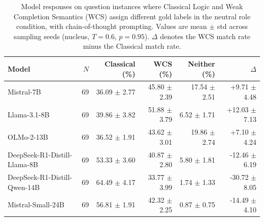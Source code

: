 \begin{table}[htbp]
\caption{Model responses on question instances where Classical Logic and Weak Completion Semantics (WCS) assign different gold labels in the neutral role condition, with chain-of-thought prompting. Values are mean $\pm$ std across sampling seeds (nucleus, $T=0.6$, $p=0.95$). $\Delta$ denotes the WCS match rate minus the Classical match rate.}
\label{tab:disagreement-neutral-cot}
\begin{tabular}{lrrrrr}
\toprule
Model & $N$ & Classical (\%) & WCS (\%) & Neither (\%) & $\Delta$ \\
\midrule
Mistral-7B & 69 & 36.09 $\pm$ 2.77 & 45.80 $\pm$ 2.39 & 17.54 $\pm$ 2.51 & +9.71 $\pm$ 4.48 \\
Llama-3.1-8B & 69 & 39.86 $\pm$ 3.82 & 51.88 $\pm$ 3.79 & 6.52 $\pm$ 1.71 & +12.03 $\pm$ 7.13 \\
OLMo-2-13B & 69 & 36.52 $\pm$ 1.91 & 43.62 $\pm$ 3.01 & 19.86 $\pm$ 2.74 & +7.10 $\pm$ 4.24 \\
DeepSeek-R1-Distill-Llama-8B & 69 & 53.33 $\pm$ 3.60 & 40.87 $\pm$ 2.80 & 5.80 $\pm$ 1.81 & -12.46 $\pm$ 6.19 \\
DeepSeek-R1-Distill-Qwen-14B & 69 & 64.49 $\pm$ 4.17 & 33.77 $\pm$ 3.99 & 1.74 $\pm$ 1.33 & -30.72 $\pm$ 8.05 \\
Mistral-Small-24B & 69 & 56.81 $\pm$ 1.91 & 42.32 $\pm$ 2.25 & 0.87 $\pm$ 0.75 & -14.49 $\pm$ 4.10 \\
\bottomrule
\end{tabular}
\end{table}

